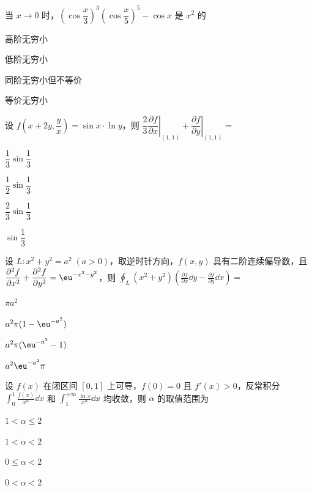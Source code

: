 
\begin{question}[index=1]
当 $x\to0$ 时，$\left(\cos\dfrac{x}{3}\right)^3\left(\cos\dfrac{x}{5}\right)^5-\cos x$ 是 $x^2$ 的
\begin{choices}[columns=2]
\item 高阶无穷小
\item 低阶无穷小
\item 同阶无穷小但不等价
\item 等价无穷小
\end{choices}
\end{question}
\QuestionBreak

\begin{question}[index=2]
设 $f\!\left(x+2y,\dfrac yx\right)=\sin x\cdot\ln y$，则 $\left.\dfrac23\dfrac{\partial f}{\partial x}\right|_{(1,1)}+\left.\dfrac{\partial f}{\partial y}\right|_{(1,1)}=$
\begin{choices}[columns=4]
\item $\dfrac13\sin\dfrac13$
\item $\dfrac12\sin\dfrac13$
\item $\dfrac23\sin\dfrac13$
\item $\sin\dfrac13$
\end{choices}
\end{question}
\QuestionBreak

\begin{question}[index=3]
设 $L\colon x^2+y^2=a^2\;(a>0)$，取逆时针方向，$f(x,y)$ 具有二阶连续偏导数，且 $\dfrac{\partial^2 f}{\partial x^2}+\dfrac{\partial^2 f}{\partial y^2}=\eu^{-x^2-y^2}$，则 $\displaystyle\oint_L(x^2+y^2)\left(\frac{\partial f}{\partial x}\dd y-\frac{\partial f}{\partial y}\dd x\right)=$
\begin{choices}[columns=4]
\item $\pi a^2$
\item $a^2\pi(1-\eu^{-a^2})$
\item $a^2\pi(\eu^{-a^2}-1)$
\item $a^2\eu^{-a^2}\pi$
\end{choices}
\end{question}
\QuestionBreak

\begin{question}[index=4]
设 $f(x)$ 在闭区间 $[0,1]$ 上可导，$f(0)=0$ 且 $f'(x)>0$，反常积分 $\displaystyle\int_0^1\frac{f(x)}{x^\alpha}\dd x$ 和 $\displaystyle\int_1^{+\infty}\frac{\ln x}{x^\alpha}\dd x$ 均收敛，则 $\alpha$ 的取值范围为
\begin{choices}[columns=4]
\item $1<\alpha\le2$
\item $1<\alpha<2$
\item $0\le\alpha<2$
\item $0<\alpha<2$
\end{choices}
\end{question}
\QuestionBreak

